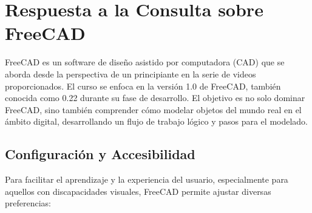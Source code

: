 \documentclass{article}
\begin{document}
\section*{Respuesta a la Consulta sobre FreeCAD}

FreeCAD es un software de diseño asistido por computadora (CAD) que se aborda desde la perspectiva de un principiante en la serie de videos proporcionados. El curso se enfoca en la versión 1.0 de FreeCAD, también conocida como 0.22 durante su fase de desarrollo. El objetivo es no solo dominar FreeCAD, sino también comprender cómo modelar objetos del mundo real en el ámbito digital, desarrollando un flujo de trabajo lógico y pasos para el modelado.

\subsection*{Configuración y Accesibilidad}
Para facilitar el aprendizaje y la experiencia del usuario, especialmente para aquellos con discapacidades visuales, FreeCAD permite ajustar diversas preferencias:
\end{document}
